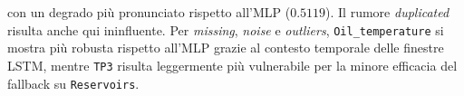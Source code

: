 \documentclass[../main.tex]{subfiles}
\begin{document}
con un degrado più pronunciato rispetto all'MLP ($0.5119$). Il rumore \textit{duplicated} risulta anche qui ininfluente. Per \textit{missing}, \textit{noise} e \textit{outliers}, \texttt{Oil\_temperature} si mostra più robusta rispetto all'MLP grazie al contesto temporale delle finestre LSTM, mentre \texttt{TP3} risulta leggermente più vulnerabile per la minore efficacia del fallback su \texttt{Reservoirs}.
\end{document}
